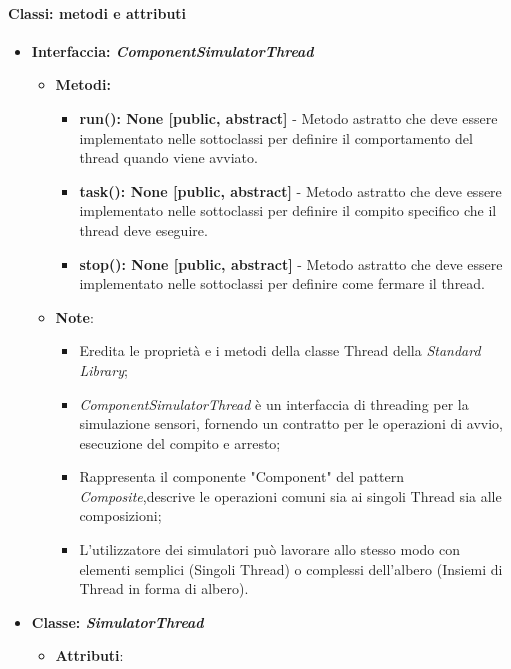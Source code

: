 \begin{itemize}
\paragraph{Classi: metodi e attributi}

\begin{itemize}
 \item{\textbf{Interfaccia: \textit{ComponentSimulatorThread}}}
    \begin{itemize}
        \item \textbf{Metodi: }
        \begin{itemize}
            \item \textbf{run(): None [public, abstract]} - Metodo astratto che deve essere implementato nelle sottoclassi per definire il comportamento del thread quando viene avviato.
            \item \textbf{task(): None [public, abstract]} - Metodo astratto che deve essere implementato nelle sottoclassi per definire il compito specifico che il thread deve eseguire.
            \item \textbf{stop(): None [public, abstract]} - Metodo astratto che deve essere implementato nelle sottoclassi per definire come fermare il thread.
        \end{itemize}
        \item\textbf{Note}:
            \begin{itemize}
                \item Eredita le proprietà e i metodi della classe Thread della \textit{Standard Library};
                \item \textit{ComponentSimulatorThread} è un interfaccia di threading per la simulazione sensori, fornendo un contratto per le operazioni di avvio, esecuzione del compito e arresto;
                \item Rappresenta il componente "Component" del pattern \textit{Composite},descrive le operazioni comuni sia ai singoli Thread sia alle composizioni;
                \item L'utilizzatore dei simulatori può lavorare allo stesso modo con elementi semplici (Singoli Thread) o complessi dell'albero (Insiemi di Thread in forma di albero).
            \end{itemize}
    \end{itemize}
    \item{\textbf{Classe: \textit{SimulatorThread}}}
    \begin{itemize}
    \item\textbf{Attributi}:

\end{itemize}
\end{itemize}
\end{itemize}
